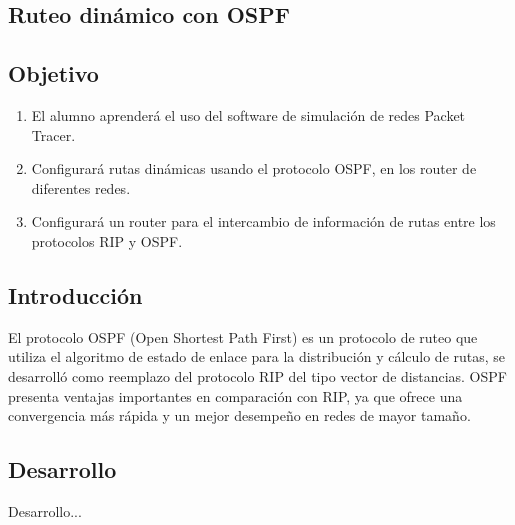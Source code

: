 \documentclass[14pt]{book}
\begin{document}
{\color{red} \subsection*{\textbf{Ruteo dinámico con OSPF}}}
\vspace{1em}

{\color{red} \subsection*{\textbf{Objetivo}}}
\vspace{1em}

\begin{enumerate}
  \item El alumno aprenderá el uso del software de simulación de redes Packet Tracer.
  \item Configurará rutas dinámicas usando el protocolo OSPF, en los router de diferentes redes.
  \item Configurará un router para el intercambio de información de rutas entre los protocolos RIP y OSPF.
\end{enumerate}

{\color{red} \subsection*{\textbf{Introducción}}}
\vspace{1em}

El protocolo OSPF (Open Shortest Path First) es un protocolo de ruteo que utiliza el algoritmo de
estado de enlace para la distribución y cálculo de rutas, se desarrolló como reemplazo del protocolo
RIP del tipo vector de distancias. OSPF presenta ventajas importantes en comparación con RIP,
ya que ofrece una convergencia más rápida y un mejor desempeño en redes de mayor tamaño.\\

{\color{red} \subsection*{\textbf{Desarrollo}}}
\vspace{1em}

Desarrollo...


 
\end{document}
